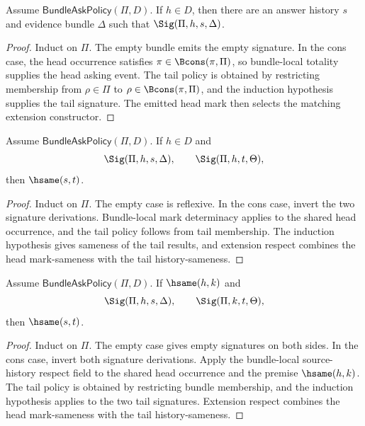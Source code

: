 \begin{theorem}
\label{thm:bundle-local-signature-existence}
Assume $\mathsf{BundleAskPolicy}(\Pi,D)$. If $h\in D$, then there are an answer history $s$ and evidence bundle $\Delta$ such that $\Sig(\Pi,h,s,\Delta)$.
\end{theorem}
\begin{proof}
Induct on $\Pi$. The empty bundle emits the empty signature. In the cons case, the head occurrence satisfies $\pi\in\Bcons(\pi,\Pi)$, so bundle-local totality supplies the head asking event. The tail policy is obtained by restricting membership from $\rho\in\Pi$ to $\rho\in\Bcons(\pi,\Pi)$, and the induction hypothesis supplies the tail signature. The emitted head mark then selects the matching extension constructor.
\end{proof}

\begin{theorem}
\label{thm:bundle-local-signature-determinacy}
Assume $\mathsf{BundleAskPolicy}(\Pi,D)$. If $h\in D$ and
$$
\Sig(\Pi,h,s,\Delta),
\qquad
\Sig(\Pi,h,t,\Theta),
$$
then $\hsame(s,t)$.
\end{theorem}
\begin{proof}
Induct on $\Pi$. The empty case is reflexive. In the cons case, invert the two signature derivations. Bundle-local mark determinacy applies to the shared head occurrence, and the tail policy follows from tail membership. The induction hypothesis gives sameness of the tail results, and extension respect combines the head mark-sameness with the tail history-sameness.
\end{proof}

\begin{theorem}
\label{thm:bundle-local-signature-source-respect}
Assume $\mathsf{BundleAskPolicy}(\Pi,D)$. If $\hsame(h,k)$ and
$$
\Sig(\Pi,h,s,\Delta),
\qquad
\Sig(\Pi,k,t,\Theta),
$$
then $\hsame(s,t)$.
\end{theorem}
\begin{proof}
Induct on $\Pi$. The empty case gives empty signatures on both sides. In the cons case, invert both signature derivations. Apply the bundle-local source-history respect field to the shared head occurrence and the premise $\hsame(h,k)$. The tail policy is obtained by restricting bundle membership, and the induction hypothesis applies to the two tail signatures. Extension respect combines the head mark-sameness with the tail history-sameness.
\end{proof}

